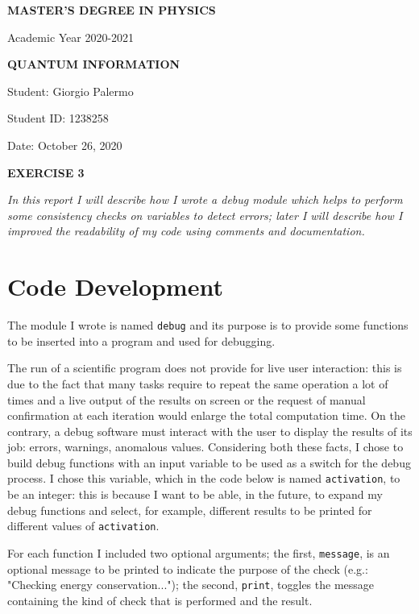 \documentclass[a4paper]{article}
\newcommand{\thedate}{October 26, 2020}
\begin{document}
\hypersetup{linkcolor = black}
\hypersetup{linkcolor = blue}
\thispagestyle{plain}
\begin{center}
    \textbf{MASTER'S DEGREE IN PHYSICS}
    
    Academic Year 2020-2021
    
    \medskip
    \textbf{QUANTUM INFORMATION}
\end{center}

\vspace{0.0cm}
Student: Giorgio Palermo

Student ID: 1238258

Date: \thedate
\begin{center}
\textbf{EXERCISE 3}
\medskip
\end{center}
\noindent
\textit{In this report I will describe how I wrote a debug module which helps to perform some consistency checks on variables to detect errors; later I will describe how I improved the readability of my code using comments and documentation. }

\section*{Code Development}

\noindent The module I wrote is named \lstinline{debug} and its purpose is to provide some functions to be inserted into a program and used for debugging.

The run of a scientific program does not provide for live user interaction: this is due to the fact that many tasks require to repeat the same operation a lot of times and a live output of the results on screen or the request of manual confirmation at each iteration would enlarge the total computation time.
On the contrary, a debug software must interact with the user to display the results of its job: errors, warnings, anomalous values.
Considering both these facts, I chose to build debug functions with an input variable to be used as a switch for the debug process.
I chose this variable, which in the code below is named \lstinline{activation}, to be an integer: this is because I want to be able, in the future, to expand my debug functions and select, for example, different results to be printed for different values of \lstinline{activation}.

\noindent For each function I included two optional arguments; the first, \lstinline{message}, is an optional message to be printed to indicate the purpose of the check (e.g.: "Checking energy conservation..."); the second, \lstinline{print}, toggles the message containing the kind of check that is performed and the result.
\end{document}

